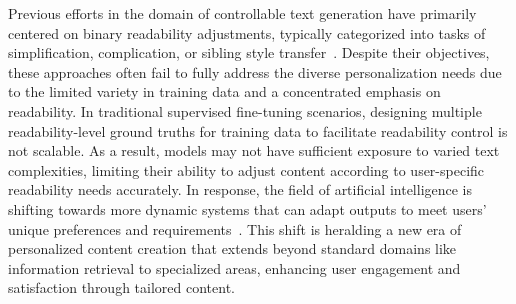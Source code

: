 \documentclass[11pt]{article}
\begin{document}
Previous efforts in the domain of controllable text generation have primarily centered on binary readability adjustments, typically categorized into tasks of simplification, complication, or sibling style transfer~\cite{goldsack2022making,guo2021automated,luo2022readability}.
Despite their objectives, these approaches often fail to fully address the diverse personalization needs due to the limited variety in training data and a concentrated emphasis on readability.
In traditional supervised fine-tuning scenarios, designing multiple readability-level ground truths for training data to facilitate readability control is not scalable.
As a result, models may not have sufficient exposure to varied text complexities, limiting their ability to adjust content according to user-specific readability needs accurately.
In response, the field of artificial intelligence is shifting towards more dynamic systems that can adapt outputs to meet users' unique preferences and requirements~\cite{kirk2024benefits}.
This shift is heralding a new era of personalized content creation that extends beyond standard domains like information retrieval to specialized areas, enhancing user engagement and satisfaction through tailored content.
\end{document}

